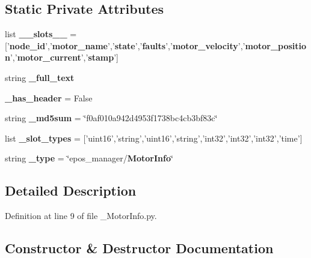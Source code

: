 \subsection*{\-Static \-Private \-Attributes}
\begin{DoxyCompactItemize}
\item 
list {\bf \-\_\-\-\_\-slots\-\_\-\-\_\-} = ['{\bf node\-\_\-id}','{\bf motor\-\_\-name}','{\bf state}','{\bf faults}','{\bf motor\-\_\-velocity}','{\bf motor\-\_\-position}','{\bf motor\-\_\-current}','{\bf stamp}']
\item 
string {\bf \-\_\-full\-\_\-text}
\item 
{\bf \-\_\-has\-\_\-header} = \-False
\item 
string {\bf \-\_\-md5sum} = \char`\"{}f0af010a942d4953f1738bc4cb3bf83c\char`\"{}
\item 
list {\bf \-\_\-slot\-\_\-types} = ['uint16','string','uint16','string','int32','int32','int32','time']
\item 
string {\bf \-\_\-type} = \char`\"{}epos\-\_\-manager/{\bf \-Motor\-Info}\char`\"{}
\end{DoxyCompactItemize}


\subsection{\-Detailed \-Description}


\-Definition at line 9 of file \-\_\-\-Motor\-Info.\-py.



\subsection{\-Constructor \& \-Destructor \-Documentation}
